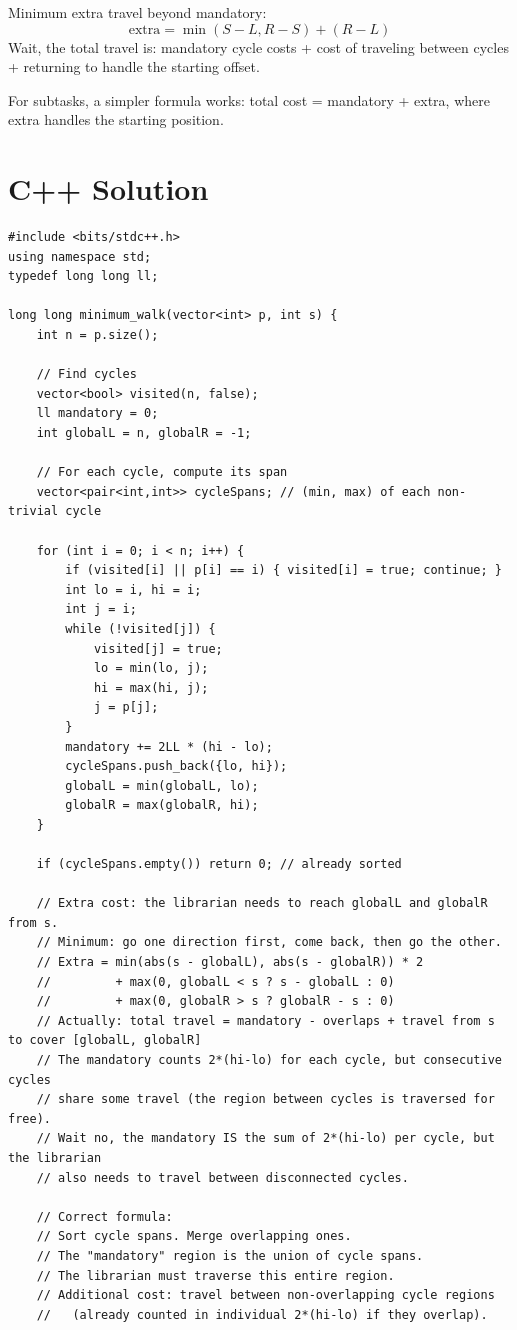 \documentclass[11pt,a4paper]{article}
\begin{document}
Minimum extra travel beyond mandatory:
\[
  \text{extra} = \min(S - L, R - S) + (R - L)
\]
Wait, the total travel is: mandatory cycle costs + cost of traveling between cycles + returning to handle the starting offset.

For subtasks, a simpler formula works: total cost = mandatory + extra, where extra handles the starting position.

\section{C++ Solution}

\begin{lstlisting}
#include <bits/stdc++.h>
using namespace std;
typedef long long ll;

long long minimum_walk(vector<int> p, int s) {
    int n = p.size();

    // Find cycles
    vector<bool> visited(n, false);
    ll mandatory = 0;
    int globalL = n, globalR = -1;

    // For each cycle, compute its span
    vector<pair<int,int>> cycleSpans; // (min, max) of each non-trivial cycle

    for (int i = 0; i < n; i++) {
        if (visited[i] || p[i] == i) { visited[i] = true; continue; }
        int lo = i, hi = i;
        int j = i;
        while (!visited[j]) {
            visited[j] = true;
            lo = min(lo, j);
            hi = max(hi, j);
            j = p[j];
        }
        mandatory += 2LL * (hi - lo);
        cycleSpans.push_back({lo, hi});
        globalL = min(globalL, lo);
        globalR = max(globalR, hi);
    }

    if (cycleSpans.empty()) return 0; // already sorted

    // Extra cost: the librarian needs to reach globalL and globalR from s.
    // Minimum: go one direction first, come back, then go the other.
    // Extra = min(abs(s - globalL), abs(s - globalR)) * 2
    //         + max(0, globalL < s ? s - globalL : 0)
    //         + max(0, globalR > s ? globalR - s : 0)
    // Actually: total travel = mandatory - overlaps + travel from s to cover [globalL, globalR]
    // The mandatory counts 2*(hi-lo) for each cycle, but consecutive cycles
    // share some travel (the region between cycles is traversed for free).
    // Wait no, the mandatory IS the sum of 2*(hi-lo) per cycle, but the librarian
    // also needs to travel between disconnected cycles.

    // Correct formula:
    // Sort cycle spans. Merge overlapping ones.
    // The "mandatory" region is the union of cycle spans.
    // The librarian must traverse this entire region.
    // Additional cost: travel between non-overlapping cycle regions
    //   (already counted in individual 2*(hi-lo) if they overlap).


\end{lstlisting}
\end{document}
